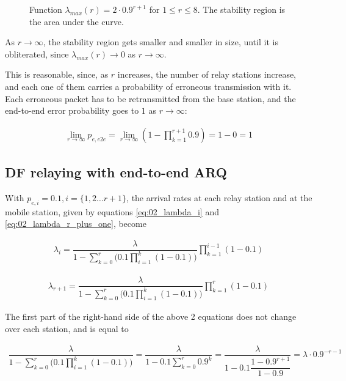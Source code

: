 \begin{figure}[H]\centering
  
  \caption{Function $\lambda_{max}(r) = 2\cdot 0.9^{r+1}$ for $1 \leq r \leq 8$.
    The stability region is the area under the curve.}
  \label{fig:04_stability_region_af_e2e}
\end{figure}

As $r \to \infty$, the stability region gets smaller and smaller in size, until
it is obliterated, since $\lambda_{max}(r) \to 0$ as $r \to \infty$.

This is reasonable, since, as $r$ increases, the number of relay stations
increase, and each one of them carries a probability of erroneous transmission
with it. Each erroneous packet has to be retransmitted from the base station,
and the end-to-end error probability goes to $1$ as $r \to \infty$:

\begin{align*}
  \displaystyle \lim_{r \to \infty} p_{e,e2e} = \lim_{r \to \infty} (1 - \prod\limits_{k=1}^{r+1} 0.9) = 1 - 0 = 1
\end{align*}


\subsection{DF relaying with end-to-end ARQ}

With $p_{e,i} = 0.1, i = \{1,2 \dots r+1\}$, the arrival rates at each relay
station and at the mobile station, given by equations \ref{eq:02_lambda_i}
and \ref{eq:02_lambda_r_plus_one}, become

\begin{align}
  \lambda_i = \dfrac{\lambda}{1 - \sum\limits_{k=0}^r \Big(0.1 \prod\limits_{i=1}^k (1 - 0.1)\Big)} \prod\limits_{k=1}^{i-1} (1 - 0.1)
  \label{eq:04_stability_region_df_e2e_lambda_i}
\end{align}

\begin{align}
  \lambda_{r+1} = \dfrac{\lambda}{1 - \sum\limits_{k=0}^r \Big(0.1 \prod\limits_{i=1}^k (1 - 0.1)\Big)} \prod\limits_{k=1}^{r} (1 - 0.1)
  \label{eq:04_stability_region_df_e2e_lambda_r_plus_one}
\end{align}

The first part of the right-hand side of the above 2 equations does not change
over each station, and is equal to

\begin{align*}
  \dfrac{\lambda}{1 - \sum\limits_{k=0}^r \Big(0.1 \prod\limits_{i=1}^k (1 - 0.1)\Big)} =
  \dfrac{\lambda}{1 - 0.1 \sum\limits_{k=0}^r 0.9^k} =
  \dfrac{\lambda}{1 - 0.1 \dfrac{1 - 0.9^{r+1}}{1- 0.9}} =
  \lambda \cdot 0.9^{-r-1}
\end{align*}

